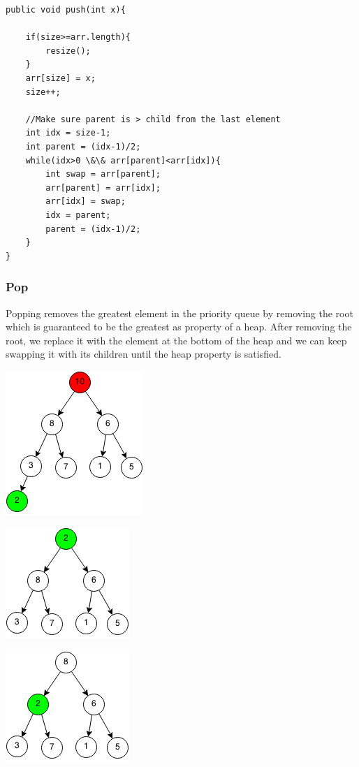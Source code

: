 \documentclass[11pt,oneside]{book}
\makeatletter
\def\maxwidth#1{\ifdim\Gin@nat@width>#1 #1\else\Gin@nat@width\fi}
\makeatother
\begin{document}
\begin{lstlisting}
public void push(int x){
        
    if(size>=arr.length){
        resize();
    }
    arr[size] = x;
    size++;
    
    //Make sure parent is > child from the last element
    int idx = size-1;
    int parent = (idx-1)/2;
    while(idx>0 \&\& arr[parent]<arr[idx]){
        int swap = arr[parent];
        arr[parent] = arr[idx];
        arr[idx] = swap;
        idx = parent;
        parent = (idx-1)/2;
    }
}
\end{lstlisting}

\subsubsection{Pop}

Popping removes the greatest element in the priority queue by removing the root which is guaranteed to be the greatest as property of a heap. After removing the root, we replace it with the element at the bottom of the heap and we can keep swapping it with its children until the heap property is satisfied.

\includegraphics[width=\maxwidth{\textwidth}]{maxheappop.png}

\includegraphics[width=\maxwidth{\textwidth}]{maxheappop1.png}

\includegraphics[width=\maxwidth{\textwidth}]{maxheappop2.png}
\end{document}
